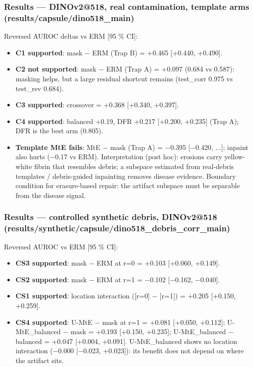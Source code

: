{\subsubsection{Results --- DINOv2@518, real contamination, template arms (results/capsule/dino518\_main)}\label{results--dinov2518-real-contamination-template-arms-resultscapsuledino518_main}

Reversed AUROC deltas vs ERM {[}95 \% CI{]}:

\begin{itemize}

\item
  \textbf{C1 supported}: mask − ERM (Trap B) = +0.465 {[}+0.440, +0.490{]}.
\item
  \textbf{C2 not supported}: mask − ERM (Trap A) = +0.097 (0.684 vs 0.587): masking helps, but a large residual
  shortcut remains (test\_corr 0.975 vs test\_rev 0.684).
\item
  \textbf{C3 supported}: crossover = +0.368 {[}+0.340, +0.397{]}.
\item
  \textbf{C4 supported}: balanced +0.19, DFR +0.217 {[}+0.200, +0.235{]} (Trap A); DFR is the best arm (0.805).
\item
  \textbf{Template MtE fails}: MtE − mask (Trap A) = −0.395 {[}−0.420, ...{]}; inpaint also hurts (−0.17 vs ERM).
  Interpretation (post hoc): erosions carry yellow-white fibrin that resembles debris; a subspace estimated from
  real-debris templates / debris-guided inpainting removes disease evidence. Boundary condition for
  erasure-based repair: the artifact subspace must be separable from the disease signal.
\end{itemize}

\subsubsection{Results --- controlled synthetic debris, DINOv2@518 (results/synthetic/capsule/dino518\_debris\_corr\_main)}\label{results--controlled-synthetic-debris-dinov2518-resultssyntheticcapsuledino518_debris_corr_main}

Reversed AUROC vs ERM {[}95 \% CI{]}:

\begin{itemize}

\item
  \textbf{CS3 supported}: mask − ERM at r=0 = +0.103 {[}+0.060, +0.149{]}.
\item
  \textbf{CS2 supported}: mask − ERM at r=1 = −0.102 {[}−0.162, −0.040{]}.
\item
  \textbf{CS1 supported}: location interaction ({[}r=0{]} − {[}r=1{]}) = +0.205 {[}+0.150, +0.259{]}.
\item
  \textbf{CS4 supported}: U-MtE − mask at r=1 = +0.081 {[}+0.050, +0.112{]}; U-MtE\_balanced − mask = +0.193
  {[}+0.150, +0.235{]}; U-MtE\_balanced − balanced = +0.047 {[}+0.004, +0.091{]}. U-MtE\_balanced shows no location
  interaction (−0.000 {[}−0.023, +0.023{]}): its benefit does not depend on where the artifact sits.
\end{itemize}

}
